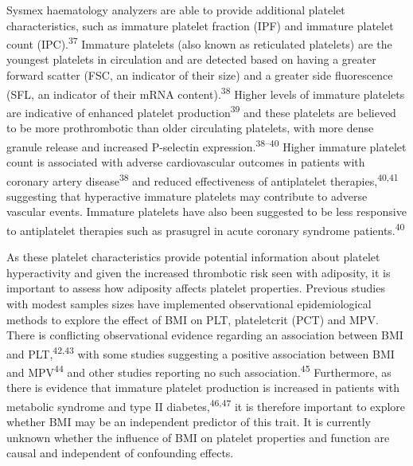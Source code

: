 \documentclass[11pt,twoside]{bristolthesis}
\begin{document}
Sysmex haematology analyzers are able to provide additional platelet characteristics, such as immature platelet fraction (IPF) and immature platelet count (IPC).\textsuperscript{37} Immature platelets (also known as reticulated platelets) are the youngest platelets in circulation and are detected based on having a greater forward scatter (FSC, an indicator of their size) and a greater side fluorescence (SFL, an indicator of their mRNA content).\textsuperscript{38} Higher levels of immature platelets are indicative of enhanced platelet production\textsuperscript{39} and these platelets are believed to be more prothrombotic than older circulating platelets, with more dense granule release and increased P-selectin expression.\textsuperscript{38--40} Higher immature platelet count is associated with adverse cardiovascular outcomes in patients with coronary artery disease\textsuperscript{38} and reduced effectiveness of antiplatelet therapies,\textsuperscript{40,41} suggesting that hyperactive immature platelets may contribute to adverse vascular events. Immature platelets have also been suggested to be less responsive to antiplatelet therapies such as prasugrel in acute coronary syndrome patients.\textsuperscript{40}

As these platelet characteristics provide potential information about platelet hyperactivity and given the increased thrombotic risk seen with adiposity, it is important to assess how adiposity affects platelet properties. Previous studies with modest samples sizes have implemented observational epidemiological methods to explore the effect of BMI on PLT, plateletcrit (PCT) and MPV. There is conflicting observational evidence regarding an association between BMI and PLT,\textsuperscript{42,43} with some studies suggesting a positive association between BMI and MPV\textsuperscript{44} and other studies reporting no such association.\textsuperscript{45} Furthermore, as there is evidence that immature platelet production is increased in patients with metabolic syndrome and type II diabetes,\textsuperscript{46,47} it is therefore important to explore whether BMI may be an independent predictor of this trait. It is currently unknown whether the influence of BMI on platelet properties and function are causal and independent of confounding effects.
\end{document}
